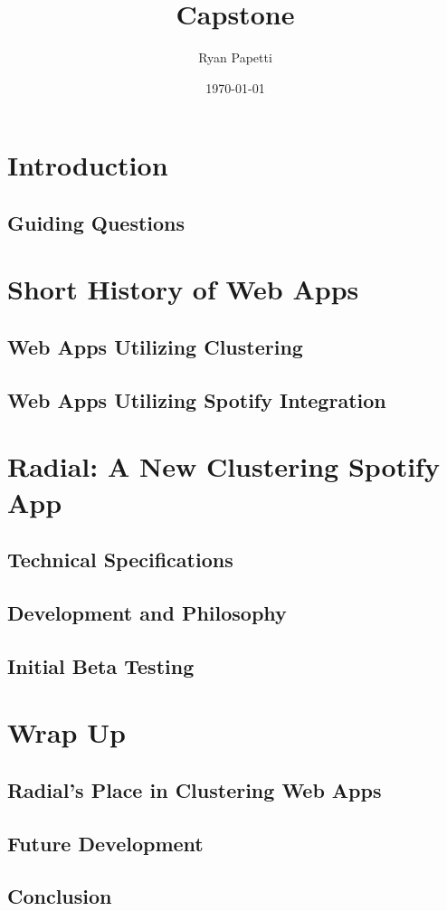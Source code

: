 \documentclass[12pt]{article}
\title{Capstone}
\author{Ryan Papetti}
\date{\today}
\begin{document}
\maketitle
\tableofcontents

\section{Introduction}
\subsection{Guiding Questions}

\section{Short History of Web Apps}

\subsection{Web Apps Utilizing Clustering}


\subsection{Web Apps Utilizing Spotify Integration}




\section{Radial: A New Clustering Spotify App}

\subsection{Technical Specifications}


\subsection{Development and Philosophy}


\subsection{Initial Beta Testing}


\section{Wrap Up}
\subsection{Radial's Place in Clustering Web Apps}
\subsection{Future Development}
\subsection{Conclusion}




\end{document}
